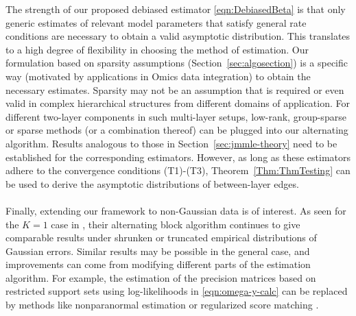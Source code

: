 The strength of our proposed debiased estimator \eqref{eqn:DebiasedBeta} is that only generic estimates of relevant model parameters that satisfy general rate conditions are necessary to obtain a valid asymptotic distribution. This translates to a high degree of flexibility in choosing the method of estimation. Our formulation based on sparsity assumptions (Section~\ref{sec:algosection}) is a specific way (motivated by applications in Omics data integration) to obtain the necessary estimates. Sparsity may not be an assumption that is required or even valid in complex hierarchical structures from different domains of application. For different two-layer components in such multi-layer setups, low-rank, group-sparse or sparse methods (or a combination thereof) can be plugged into our alternating algorithm. Results analogous to those in Section~\ref{sec:jmmle-theory} need to be established for the corresponding estimators. However, as long as these estimators adhere to the convergence conditions (T1)-(T3), Theorem~\ref{Thm:ThmTesting} can be used to derive the asymptotic distributions of between-layer edges.

\paragraph{}
Finally, extending our framework to non-Gaussian data is of interest. As seen for the $K=1$ case in \cite{LinEtal16}, their alternating block algorithm continues to give comparable results under shrunken or truncated empirical distributions of Gaussian errors. Similar results may be possible in the general case, and improvements can come from modifying different parts of the estimation algorithm. For example, the estimation of the precision matrices based on restricted support sets using log-likelihoods in \eqref{eqn:omega-y-calc} can be replaced by methods like nonparanormal estimation \citep{LiuLaffertyWasserman09} or regularized score matching \citep{LinDrtonShojaie16}.